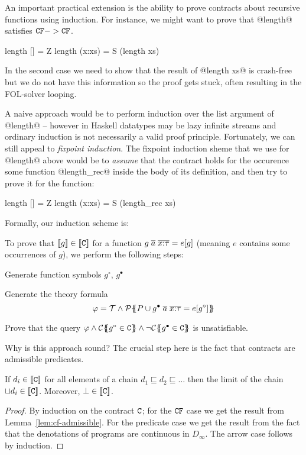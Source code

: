 
An important practical extension is the ability to prove contracts about recursive functions
using induction. For instance, we might want to prove that @length@ satisfies ${\tt CF} -> {\tt CF}$.
\begin{code}
  length []     = Z
  length (x:xs) = S (length xs)
\end{code}
In the second case we need to show that the result of @length xs@ is crash-free but we do not
have this information so the proof gets stuck, often resulting in the FOL-solver looping.

A naive approach would be to perform induction over the list argument of @length@ -- however
in Haskell datatypes may be lazy infinite streams and ordinary induction is not necessarily
a valid proof principle. Fortunately, we can still appeal to {\em fixpoint induction}. The
fixpoint induction sheme that we use for @length@ above would be to {\em assume} that the
contract holds for the occurence some function @length_rec@ inside the body of its definition,
and then try to prove it for the function:
\begin{code}
  length []     = Z
  length (x:xs) = S (length_rec xs)
\end{code}

Formally, our induction scheme is:
\begin{definition}\label{def:induction}
To prove that $[\![g]\!] \in [\![{\tt C}]\!]$ for a function
$g\;\overline{a}\;\overline{x{:}\tau} = e[g]$ (meaning $e$ contains
some occurrences of $g$), we perform the following steps:
\begin{itemize*}
  \item Generate function symbols $g^{\circ}$, $g^{\bullet}$
  \item Generate the theory formula \[ \varphi = {\cal T} \land
             {\cal P}\{\!\!\{P \cup g^{\bullet}\;\overline{a}\;\overline{x{:}\tau} = e[g^{\circ}]\}\!\!\} \]
  \item Prove that the query $\phi \land \ctrans{}{}{g^{\circ} \in \Ct} \land \neg \ctrans{}{}{g^{\bullet} \in \Ct}$
        is unsatisfiable.
\end{itemize*}
\end{definition}

Why is this approach sound? The crucial step here is the fact that contracts are admissible predicates.
\begin{theorem}
If $d_i \in [\![{\tt C}]\!]$ for all elements of a chain $d_1 \sqsubseteq d_2 \sqsubseteq \ldots$ then the limit of the chain
$\sqcup d_i \in [\![{\tt C}]\!]$. Moreover, $\bot \in [\![{\tt C}]\!]$.
\end{theorem}
\begin{proof} By induction on the contract ${\tt C}$; for the ${\tt CF}$ case we get the result from Lemma~\ref{lem:cf-admissible}.
For the predicate case we get the result from the fact that the denotations of programs
are continuous in $D_{\infty}$. The arrow case follows by induction.
\end{proof}

